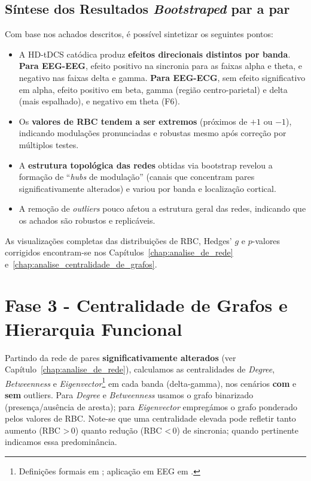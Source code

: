 \subsection{Síntese dos Resultados \textit{Bootstraped} par a par}
Com base nos achados descritos, é possível sintetizar os seguintes pontos:
\begin{itemize}
  \item A HD-tDCS catódica produz \textbf{efeitos direcionais distintos por banda}. \textbf{Para EEG-EEG}, efeito positivo na sincronia para as faixas alpha e theta, e negativo nas faixas delta e gamma. \textbf{Para EEG-ECG}, sem efeito significativo em alpha, efeito positivo em beta, gamma (região centro-parietal) e delta (mais espalhado), e negativo em theta (F6).
  \item Os \textbf{valores de RBC tendem a ser extremos} (próximos de $+1$ ou $-1$), indicando modulações pronunciadas e robustas mesmo após correção por múltiplos testes.
  \item A \textbf{estrutura topológica das redes} obtidas via bootstrap revelou a formação de ``\textit{hubs} de modulação'' (canais que concentram pares significativamente alterados) e variou por banda e localização cortical.
  \item A remoção de \textit{outliers} pouco afetou a estrutura geral das redes, indicando que os achados são robustos e replicáveis.
\end{itemize}

As visualizações completas das distribuições de RBC, Hedges' $g$ e $p$-valores corrigidos encontram-se nos Capítulos~\ref{chap:analise_de_rede} e~\ref{chap:analise_centralidade_de_grafos}.

\section{Fase 3 - Centralidade de Grafos e Hierarquia Funcional}
\label{sec:fase3_centralidade}

Partindo da rede de pares \textbf{significativamente alterados} (ver Capítulo~\ref{chap:analise_de_rede}), calculamos as centralidades de \textit{Degree}, \textit{Betweenness} e \textit{Eigenvector}\footnote{Definições formais em ; aplicação em EEG em .} em cada banda (delta-gamma), nos cenários \textbf{com} e \textbf{sem} outliers. Para \textit{Degree} e \textit{Betweenness} usamos o grafo binarizado (presença/ausência de aresta); para \textit{Eigenvector} empregámos o grafo ponderado pelos valores de RBC. Note-se que uma centralidade elevada pode refletir tanto aumento (RBC >\,0) quanto redução (RBC <\,0) de sincronia; quando pertinente indicamos essa predominância.

